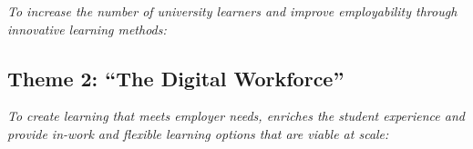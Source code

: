 \documentclass[conference]{IEEEtran}
\begin{document}

{\emph{To increase the number of university learners and improve
employability through innovative learning methods:}}\newline



\subsection*{Theme 2: ``The Digital Workforce''}

{\emph{To create learning that meets employer needs, enriches the
student experience and provide in-work and flexible learning options
that are viable at scale:}}\newline

\end{document}
